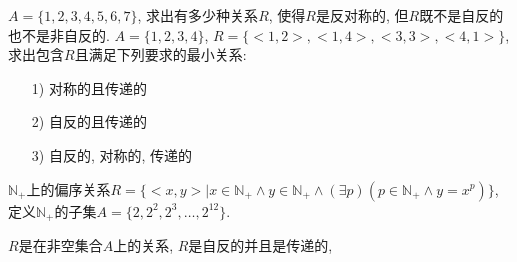 \documentclass{exam}
\begin{document}
\begin{questions}
    \question[5]$A=\{1, 2, 3, 4, 5, 6, 7\}$, 求出有多少种关系$R$, 使得$R$是反对称的, 但$R$既不是自反的也不是非自反的.
    \question[9]$A=\{1, 2, 3, 4\}$, $R=\{<1, 2>, <1, 4>, <3, 3>, <4, 1>\}$, 求出包含$R$且满足下列要求的最小关系: 
    \begin{enumerate}
        \item[1)] 对称的且传递的
        \item[2)] 自反的且传递的
        \item[3)] 自反的, 对称的, 传递的
    \end{enumerate}
    \question[10]$\mathbb{N}_+$上的偏序关系$R=\{<x, y>| x \in \mathbb{N}_+ \land y \in \mathbb{N}_+ \land (\exists p)(p \in \mathbb{N}_+ \land y=x^p)\}$, 定义$\mathbb{N}_+$的子集$A=\{2, 2^2, 2^3, \ldots, 2^{12}\}$.
    \question[10]$R$是在非空集合$A$上的关系, $R$是自反的并且是传递的,
\end{questions}
\end{document}
